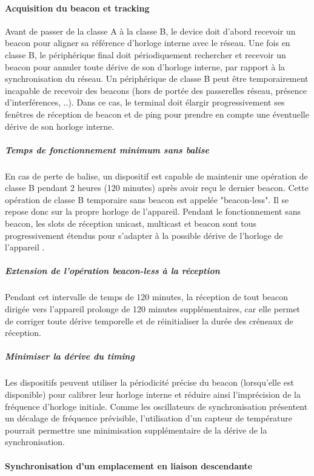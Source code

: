 \documentclass[11pt]{article}
\begin{document}
\paragraph{Acquisition du beacon et tracking }
Avant de passer de la classe A à la classe B, le device doit d'abord recevoir un beacon pour aligner sa référence d'horloge interne avec le réseau. Une fois en classe B, le périphérique final doit périodiquement rechercher et recevoir un beacon pour annuler toute dérive de son d'horloge interne, par rapport à la synchronisation du réseau. Un périphérique de classe B peut être temporairement incapable de recevoir des beacons (hors de portée des passerelles réseau, présence d'interférences, ..). Dans ce cas, le terminal doit élargir progressivement ses fenêtres de réception de beacon et de ping pour prendre en compte une éventuelle dérive de son horloge interne.
\subparagraph{Temps de fonctionnement minimum sans balise}
En cas de perte de balise, un dispositif est capable de maintenir une opération de classe B pendant 2 heures (120 minutes) après avoir reçu le dernier beacon. Cette opération de classe B temporaire sans beacon est appelée "beacon-less". Il se repose donc sur la propre horloge de l'appareil. Pendant le fonctionnement sans beacon, les slots de réception unicast, multicast et beacon sont tous progressivement étendus pour s'adapter à la possible dérive de l'horloge de l'appareil .
\subparagraph{Extension de l'opération beacon-less à la réception}
Pendant cet intervalle de temps de 120 minutes, la réception de tout beacon dirigée vers l'appareil  prolonge de  120 minutes supplémentaires, car elle permet de corriger toute dérive temporelle et de réinitialiser la durée des créneaux de réception.
\subparagraph{Minimiser la dérive du timing}
Les dispositifs peuvent utiliser la périodicité précise du beacon (lorsqu'elle est disponible) pour calibrer leur horloge interne et réduire ainsi l'imprécision de la fréquence d'horloge initiale. Comme les oscillateurs de synchronisation présentent un décalage de fréquence prévisible, l'utilisation d'un capteur de température pourrait permettre une minimisation supplémentaire de la dérive de la synchronisation.

\paragraph{Synchronisation d'un emplacement en liaison descendante}
\end{document}
